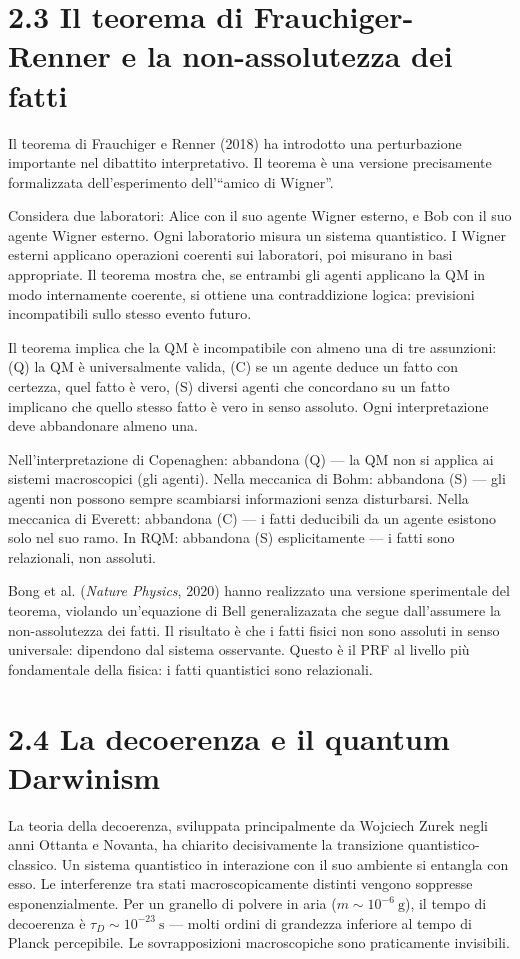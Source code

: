 \documentclass[11.5pt,a4paper,openany]{book}
\theoremstyle{remark}
\begin{document}
\section{2.3 Il teorema di Frauchiger-Renner e la non-assolutezza dei fatti}

Il teorema di Frauchiger e Renner (2018) ha introdotto una perturbazione importante nel dibattito interpretativo. Il teorema è una versione precisamente formalizzata dell'esperimento dell'``amico di Wigner''.

Considera due laboratori: Alice con il suo agente Wigner esterno, e Bob con il suo agente Wigner esterno. Ogni laboratorio misura un sistema quantistico. I Wigner esterni applicano operazioni coerenti sui laboratori, poi misurano in basi appropriate. Il teorema mostra che, se entrambi gli agenti applicano la QM in modo internamente coerente, si ottiene una contraddizione logica: previsioni incompatibili sullo stesso evento futuro.

Il teorema implica che la QM è incompatibile con almeno una di tre assunzioni: (Q) la QM è universalmente valida, (C) se un agente deduce un fatto con certezza, quel fatto è vero, (S) diversi agenti che concordano su un fatto implicano che quello stesso fatto è vero in senso assoluto. Ogni interpretazione deve abbandonare almeno una.

Nell'interpretazione di Copenaghen: abbandona (Q) --- la QM non si applica ai sistemi macroscopici (gli agenti).
Nella meccanica di Bohm: abbandona (S) --- gli agenti non possono sempre scambiarsi informazioni senza disturbarsi.
Nella meccanica di Everett: abbandona (C) --- i fatti deducibili da un agente esistono solo nel suo ramo.
In RQM: abbandona (S) esplicitamente --- i fatti sono relazionali, non assoluti.

Bong et al. (\textit{Nature Physics}, 2020) hanno realizzato una versione sperimentale del teorema, violando un'equazione di Bell generalizazata che segue dall'assumere la non-assolutezza dei fatti. Il risultato è che i fatti fisici non sono assoluti in senso universale: dipendono dal sistema osservante. Questo è il PRF al livello più fondamentale della fisica: i fatti quantistici sono relazionali.

\section{2.4 La decoerenza e il quantum Darwinism}

La teoria della decoerenza, sviluppata principalmente da Wojciech Zurek negli anni Ottanta e Novanta, ha chiarito decisivamente la transizione quantistico-classico. Un sistema quantistico in interazione con il suo ambiente si entangla con esso. Le interferenze tra stati macroscopicamente distinti vengono soppresse esponenzialmente. Per un granello di polvere in aria ($m \sim 10^{-6}\ \text{g}$), il tempo di decoerenza è $\tau_D \sim 10^{-23}\ \text{s}$ --- molti ordini di grandezza inferiore al tempo di Planck percepibile. Le sovrapposizioni macroscopiche sono praticamente invisibili.
\end{document}
